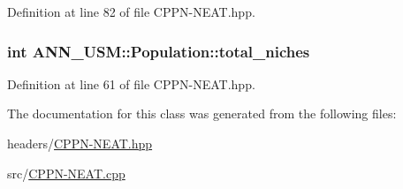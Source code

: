 Definition at line 82 of file C\-P\-P\-N-\/\-N\-E\-A\-T.\-hpp.

\hypertarget{class_a_n_n___u_s_m_1_1_population_a5dd00b369c21214466d0f155ba0e11ee}{
\subsubsection[{total\-\_\-niches}]{\setlength{\rightskip}{0pt plus 5cm}int A\-N\-N\-\_\-\-U\-S\-M\-::\-Population\-::total\-\_\-niches}}\label{class_a_n_n___u_s_m_1_1_population_a5dd00b369c21214466d0f155ba0e11ee}


Definition at line 61 of file C\-P\-P\-N-\/\-N\-E\-A\-T.\-hpp.



The documentation for this class was generated from the following files\-:\begin{DoxyCompactItemize}
\item 
headers/\hyperlink{_c_p_p_n-_n_e_a_t_8hpp}{C\-P\-P\-N-\/\-N\-E\-A\-T.\-hpp}\item 
src/\hyperlink{_c_p_p_n-_n_e_a_t_8cpp}{C\-P\-P\-N-\/\-N\-E\-A\-T.\-cpp}\end{DoxyCompactItemize}

